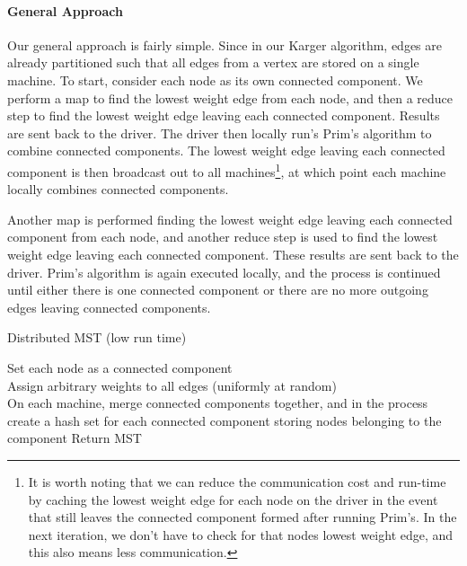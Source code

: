 \documentclass[12pt]{article}
\begin{document}
\paragraph{General Approach}
Our general approach is fairly simple. Since in our Karger algorithm, edges are already partitioned such that all edges from a vertex are stored on a single machine. To start, consider each node as its own connected component. We perform a map to find the lowest weight edge from each node, and then a reduce step to find the lowest weight edge leaving each connected component. Results are sent back to the driver. 
The driver then locally run's Prim's algorithm to combine connected components. The lowest weight edge leaving each connected component is then broadcast out to all machines\footnote{It is worth noting that we can reduce the communication cost and run-time by caching the lowest weight edge for each node on the driver in the event that still leaves the connected component formed after running Prim's. In the next iteration, we don't have to check for that nodes lowest weight edge, and this also means less communication.
}, at which point each machine locally combines connected components. 

Another map is performed finding the lowest weight edge leaving each connected component from each node, and another reduce step is used to find the lowest weight edge leaving each connected component. These results are sent back to the driver. Prim's algorithm is again executed locally, and the process is continued until either there is one connected component or there are no more outgoing edges leaving connected components.

\LinesNumbered
\begin{algorithm}[H]
\caption{Distributed MST (low run time)}
Set each node as a connected component \\
Assign arbitrary weights to all edges (uniformly at random) \\
 {
  On each machine, merge connected components together, and in the process create a hash set for each connected component storing nodes belonging to the component
}
Return MST
\end{algorithm}
\end{document}
